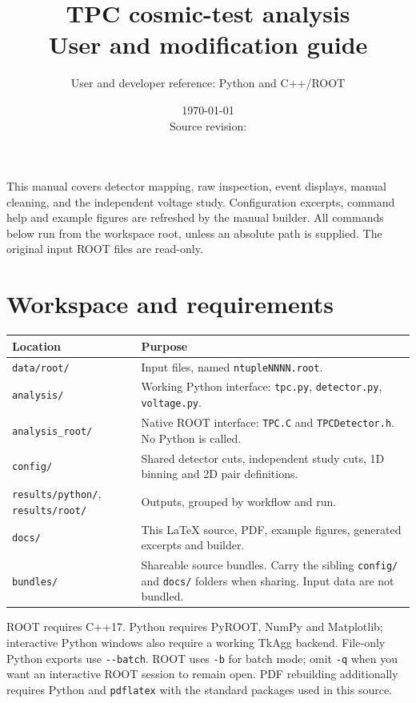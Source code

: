 \documentclass[11pt,a4paper]{article}
\title{TPC cosmic-test analysis\\User and modification guide}
\author{User and developer reference: Python and C++/ROOT}
\date{\today\\Source revision: \texttt{\manualrevision}}
\begin{document}
\maketitle
This manual covers detector mapping, raw inspection, event displays, manual cleaning,
and the independent voltage study. Configuration excerpts, command help and example
figures are refreshed by the manual builder. All commands below run from the workspace
root, unless an absolute path is supplied. The original input ROOT files are read-only.
\tableofcontents
\newpage

\section{Workspace and requirements}
\begin{longtable}{p{.32\linewidth}p{.62\linewidth}}
\toprule Location & Purpose \\\midrule
\texttt{data/root/} & Input files, named \texttt{ntupleNNNN.root}.\\
\texttt{analysis/} & Working Python interface: \texttt{tpc.py}, \texttt{detector.py}, \texttt{voltage.py}.\\
\texttt{analysis\_root/} & Native ROOT interface: \texttt{TPC.C} and \texttt{TPCDetector.h}. No Python is called.\\
\texttt{config/} & Shared detector cuts, independent study cuts, 1D binning and 2D pair definitions.\\
\texttt{results/python/}, \texttt{results/root/} & Outputs, grouped by workflow and run.\\
\texttt{docs/} & This LaTeX source, PDF, example figures, generated excerpts and builder.\\
\texttt{bundles/} & Shareable source bundles. Carry the sibling \texttt{config/} and \texttt{docs/} folders when sharing. Input data are not bundled.\\
\bottomrule
\end{longtable}
ROOT requires C++17. Python requires PyROOT, NumPy and Matplotlib; interactive Python
windows also require a working TkAgg backend. File-only Python exports use
\texttt{-{}-batch}. ROOT uses \texttt{-b} for batch mode; omit \texttt{-q} when you want
an interactive ROOT session to remain open. PDF rebuilding additionally requires
Python and \texttt{pdflatex} with the standard packages used in this source.
\end{document}
